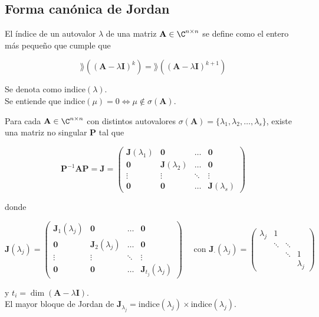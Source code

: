 \subsection{Forma canónica de Jordan}

\begin{defi}
El índice de un autovalor $\lambda$ de una matriz $\mathbf{A} \in \C^{n \times n}$ se define como el entero más pequeño que cumple que

\[ \rang((\mathbf{A} - \lambda \mathbf{I})^k) = \rang((\mathbf{A} - \lambda \mathbf{I})^{k+1}) \] 

Se denota como $\mathrm{indice}(\lambda)$.\\

Se entiende que $\mathrm{indice}(\mu) = 0 \iff \mu \not \in \sigma(\mathbf{A})$.
\end{defi}

\begin{teo}
Para cada $\mathbf{A} \in \C^{n \times n}$ con distintos autovalores $\sigma(\mathbf{A}) = \{\lambda_1, \lambda_2,\dots, \lambda_s \}$, existe una matriz no singular $\mathbf{P}$ tal que

\[ \mathbf{P}^{-1} \mathbf{A} \mathbf{P} = \mathbf{J} = \left(\begin{array}{cccc}
\mathbf{J}(\lambda_1) & \mathbf{0}            & \dots  & \mathbf{0}\\
\mathbf{0}            & \mathbf{J}(\lambda_2) & \dots  & \mathbf{0}\\
\vdots                & \vdots                & \ddots & \vdots\\
\mathbf{0}            & \mathbf{0}            & \dots  & \mathbf{J}(\lambda_s)
\end{array}\right) \]

donde 

\[ \mathbf{J}(\lambda_j) = \left(\begin{array}{cccc}
\mathbf{J}_1(\lambda_j) & \mathbf{0}              & \dots  & \mathbf{0}\\
\mathbf{0}              & \mathbf{J}_2(\lambda_j) & \dots  & \mathbf{0}\\
\vdots                  & \vdots                  & \ddots & \vdots\\
\mathbf{0}              & \mathbf{0}              & \dots  & \mathbf{J}_{t_j}(\lambda_j)
\end{array}\right) \quad \text{ con } \mathbf{J}_\cdot(\lambda_j) = 
\left(\begin{array}{cccc} 
\lambda_j & 1      &         & \\
          & \ddots & \ddots     & \\
          &        & \ddots     & 1\\
          &        &            & \lambda_j
\end{array}\right) \]

y $t_i = \dim(\mathbf{A} - \lambda \mathbf{I})$.\\

El mayor bloque de Jordan de $\mathbf{J}_{\lambda_j} = \mathrm{indice}(\lambda_j) \times \mathrm{indice}(\lambda_j)$.
\end{teo}

